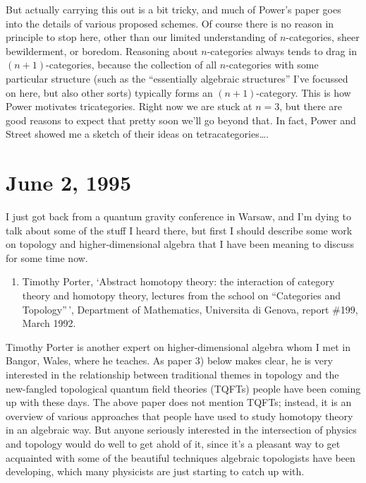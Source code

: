 \documentclass{article}
\def\tightlist{}
\begin{document}
But actually carrying this out is a bit tricky, and much of Power's
paper goes into the details of various proposed schemes. Of course there
is no reason in principle to stop here, other than our limited
understanding of \(n\)-categories, sheer bewilderment, or boredom.
Reasoning about \(n\)-categories always tends to drag in
\((n+1)\)-categories, because the collection of all \(n\)-categories
with some particular structure (such as the ``essentially algebraic
structures'' I've focussed on here, but also other sorts) typically
forms an \((n+1)\)-category. This is how Power motivates tricategories.
Right now we are stuck at \(n = 3\), but there are good reasons to
expect that pretty soon we'll go beyond that. In fact, Power and Street
showed me a sketch of their ideas on tetracategories\ldots.
\hypertarget{week54}{%
\section{June 2, 1995}\label{week54}}

I just got back from a quantum gravity conference in Warsaw, and I'm
dying to talk about some of the stuff I heard there, but first I should
describe some work on topology and higher-dimensional algebra that I
have been meaning to discuss for some time now.

\begin{enumerate}
\def\labelenumi{\arabic{enumi})}
\tightlist
\item
  Timothy Porter, `Abstract homotopy theory: the interaction of category
  theory and homotopy theory, lectures from the school on ``Categories
  and Topology''\,', Department of Mathematics, Universita di Genova,
  report \#199, March 1992.
\end{enumerate}

Timothy Porter is another expert on higher-dimensional algebra whom I
met in Bangor, Wales, where he teaches. As paper 3) below makes clear,
he is very interested in the relationship between traditional themes in
topology and the new-fangled topological quantum field theories (TQFTs)
people have been coming up with these days. The above paper does not
mention TQFTs; instead, it is an overview of various approaches that
people have used to study homotopy theory in an algebraic way. But
anyone seriously interested in the intersection of physics and topology
would do well to get ahold of it, since it's a pleasant way to get
acquainted with some of the beautiful techniques algebraic topologists
have been developing, which many physicists are just starting to catch
up with.
\end{document}
